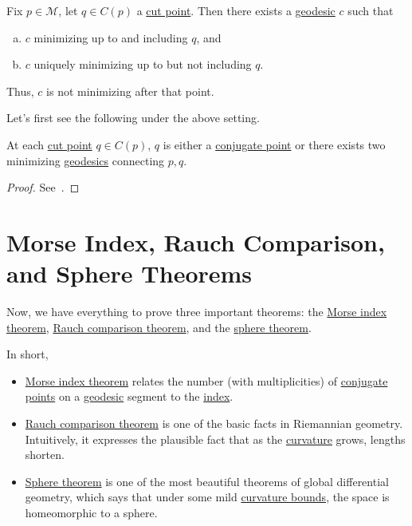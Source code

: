 
\begin{prev}
	Fix \(p\in \mathcal{M} \), let \(q\in C(p)\) a \hyperref[def:cut-point]{cut point}. Then there exists a \hyperref[def:geodesic]{geodesic} \(c\) such that
	\begin{enumerate}[(a)]
		\item \(c\) minimizing up to and including \(q\), and
		\item \(c\) uniquely minimizing up to but not including \(q\).
	\end{enumerate}
	Thus, \(c\) is not minimizing after that point.
\end{prev}

Let's first see the following under the above setting.

\begin{proposition}\label{prop:lec21}
	At each \hyperref[def:cut-point]{cut point} \(q\in C(p)\), \(q\) is either a \hyperref[def:conjugate-point]{conjugate point} or there exists two minimizing \hyperref[def:geodesic]{geodesics} connecting \(p, q\).
\end{proposition}
\begin{proof}
	See~\cite{flaherty2013riemannian}.
\end{proof}

\chapter{Morse Index, Rauch Comparison, and Sphere Theorems}
Now, we have everything to prove three important theorems: the \hyperref[thm:Morse-index]{Morse index theorem}, \hyperref[thm:Rauch-comparison]{Rauch comparison theorem}, and the \hyperref[thm:sphere]{sphere theorem}.

\begin{intuition}
	In short,
	\begin{itemize}
		\item \hyperref[thm:Morse-index]{Morse index theorem} relates the number (with multiplicities) of \hyperref[def:conjugate-point]{conjugate points} on a \hyperref[def:geodesic]{geodesic} segment to the \hyperref[def:index]{index}.
		\item \hyperref[thm:Rauch-comparison]{Rauch comparison theorem} is one of the basic facts in Riemannian geometry. Intuitively, it expresses the plausible fact that as the \hyperref[def:sectional-curvature]{curvature} grows, lengths shorten.
		\item \hyperref[thm:sphere]{Sphere theorem} is one of the most beautiful theorems of global differential geometry, which says that under some mild \hyperref[def:sectional-curvature]{curvature bounds}, the space is homeomorphic to a sphere.
	\end{itemize}
\end{intuition}


